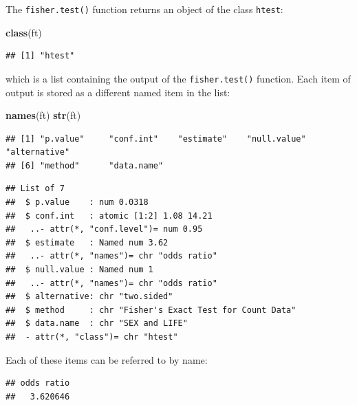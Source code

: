 \documentclass[12pt,]{book}
\newenvironment{Shaded}{\begin{snugshade}}{\end{snugshade}}
\newcommand{\KeywordTok}[1]{\textcolor[rgb]{0.13,0.29,0.53}{\textbf{#1}}}
\newcommand{\OperatorTok}[1]{\textcolor[rgb]{0.81,0.36,0.00}{\textbf{#1}}}
\newcommand{\NormalTok}[1]{#1}
\theoremstyle{definition}
\theoremstyle{definition}
\theoremstyle{definition}
\theoremstyle{remark}
\begin{document}
The \texttt{fisher.test()} function returns an object of the class
\texttt{htest}:

\begin{Shaded}
\begin{Highlighting}[]
\KeywordTok{class}\NormalTok{(ft)}
\end{Highlighting}
\end{Shaded}

\begin{verbatim}
## [1] "htest"
\end{verbatim}

which is a list containing the output of the \texttt{fisher.test()}
function. Each item of output is stored as a different named item in the
list:

\begin{Shaded}
\begin{Highlighting}[]
\KeywordTok{names}\NormalTok{(ft)}
\KeywordTok{str}\NormalTok{(ft)}
\end{Highlighting}
\end{Shaded}

\begin{verbatim}
## [1] "p.value"     "conf.int"    "estimate"    "null.value"  "alternative"
## [6] "method"      "data.name"
\end{verbatim}

\begin{verbatim}
## List of 7
##  $ p.value    : num 0.0318
##  $ conf.int   : atomic [1:2] 1.08 14.21
##   ..- attr(*, "conf.level")= num 0.95
##  $ estimate   : Named num 3.62
##   ..- attr(*, "names")= chr "odds ratio"
##  $ null.value : Named num 1
##   ..- attr(*, "names")= chr "odds ratio"
##  $ alternative: chr "two.sided"
##  $ method     : chr "Fisher's Exact Test for Count Data"
##  $ data.name  : chr "SEX and LIFE"
##  - attr(*, "class")= chr "htest"
\end{verbatim}

Each of these items can be referred to by name:

\begin{Shaded}
\end{Shaded}

\begin{verbatim}
## odds ratio 
##   3.620646
\end{verbatim}
\end{document}
